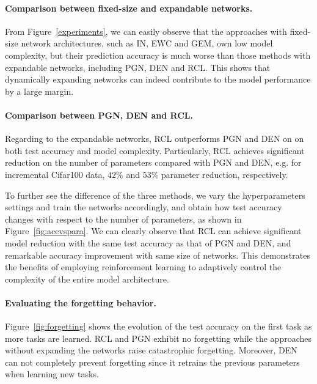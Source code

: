 \documentclass{article}
\begin{document}
\paragraph{Comparison between fixed-size and expandable networks.}
From Figure~\ref{experiments}, we can easily observe that the approaches with fixed-size network architectures, such as  IN, EWC and GEM, own low model complexity, but their prediction accuracy is much worse than those methods with expandable networks, including PGN, DEN and RCL. This shows that dynamically expanding networks can  indeed contribute to the model performance by a large margin. 


\paragraph{Comparison between PGN, DEN and RCL.} Regarding to the expandable networks, RCL outperforms PGN and DEN on on both test accuracy and model complexity. Particularly, RCL achieves significant reduction on the number of parameters compared with PGN and DEN, e.g. for incremental Cifar100 data, $42\%$ and $53\%$ parameter reduction, respectively. 

To further see the difference of the three methods, we vary the hyperparameters settings and train the networks accordingly, and obtain how test accuracy changes with respect to the number of parameters, as shown in Figure~\ref{fig:accvspara}. We can clearly observe that RCL can achieve significant model reduction with the same test accuracy as that of PGN and DEN, and remarkable accuracy improvement with same size of networks.   
This demonstrates the benefits of employing reinforcement learning to adaptively control the complexity of the entire model architecture. 


\paragraph{Evaluating the forgetting behavior.} 
Figure~\ref{fig:forgetting} shows the evolution of the test accuracy on the first task as more tasks are learned. RCL and PGN exhibit no forgetting while the approaches without expanding the networks raise catastrophic forgetting. Moreover, DEN can not completely prevent forgetting since it retrains the previous parameters when learning new tasks.
\end{document}
